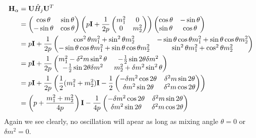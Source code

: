 \documentclass[letterpaper,12pt,english]{sphinxmanual}
\begin{document}
\begin{gather}
\begin{split}\mathbf H_{\alpha} & = \mathbf U \hat H_j  \mathbf U^T \\
& =  \begin{pmatrix}  \cos\theta & \sin\theta \\ -\sin\theta  & \cos\theta \end{pmatrix} \left( p \mathbf I + \frac{1}{2p}\begin{pmatrix} m_1^2 & 0 \\ 0 & m_2^2 \end{pmatrix} \right)   \begin{pmatrix}  \cos\theta & -\sin\theta \\ \sin\theta & \cos\theta \end{pmatrix} \\
& = p \mathbf I + \frac{1}{2p} \begin{pmatrix} \cos^2\theta m_1^2 + \sin^2\theta m_2^2 & -\sin\theta\cos\theta m_1^2 + \sin\theta\cos\theta m_2^2 \\ -\sin\theta\cos\theta m_1^2 + \sin\theta\cos\theta m_2^2 & \sin^2\theta m_1^2 + \cos^2\theta m_2^2 \end{pmatrix} \\
& = p \mathbf I + \frac{1}{2p} \begin{pmatrix} m_1^2 - \delta^2 m \sin^2\theta & -\frac{1}{2}\sin 2\theta  \delta m^2  \\ -\frac{1}{2}\sin 2\theta  \delta m^2  & m_2^2+ \delta m^2 \sin^2\theta \end{pmatrix} \\
& = p \mathbf I + \frac{1}{2p} \left( \frac{1}{2}(m_1^2+m_2^2) \mathbf I -   \frac{1}{2}\begin{pmatrix} - \delta m^2 \cos 2\theta & \delta^2 m \sin 2\theta \\  \delta m^2 \sin 2\theta & \delta^2 m\cos 2\theta \end{pmatrix} \right) \\
& = \left(p + \frac{m_1^2+m_2^2}{4p} \right)\mathbf I - \frac{1}{4p}\begin{pmatrix} - \delta m^2 \cos 2\theta & \delta^2 m \sin 2\theta \\  \delta m^2 \sin 2\theta & \delta^2 m\cos 2\theta \end{pmatrix}\end{split}\notag
\end{gather}
Again we see clearly, no oscillation will apear as long as mixing angle \(\theta=0\) or \(\delta m^2 =0\).
\end{document}
